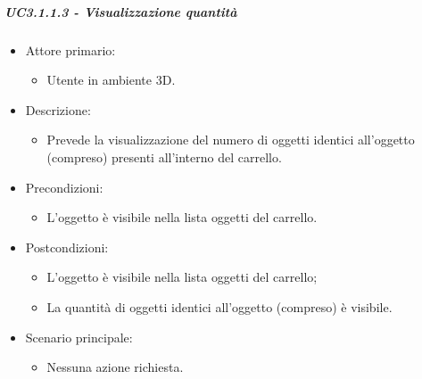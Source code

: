 \subparagraph{UC3.1.1.3 - Visualizzazione quantità}
\begin{itemize}
	
	\item Attore primario: 
	\begin{itemize}
		\item Utente in ambiente 3D.
	\end{itemize}
	\item Descrizione:
	\begin{itemize}
		\item Prevede la visualizzazione del numero di oggetti identici all'oggetto (compreso) presenti all'interno del carrello.
	\end{itemize}
	
	\item Precondizioni:
	\begin{itemize}
		\item L'oggetto è visibile nella lista oggetti del carrello.
	\end{itemize}
	
	\item Postcondizioni:
	\begin{itemize}
		\item L'oggetto è visibile nella lista oggetti del carrello;
		\item La quantità di oggetti identici all'oggetto (compreso) è visibile.
	\end{itemize}
	
	\item Scenario principale:
	\begin{itemize}
		\item Nessuna azione richiesta.
	\end{itemize}
	
\end{itemize}


